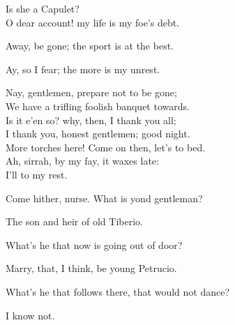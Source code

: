 \begin{speech}
Is she a Capulet? \\
O dear account! my life is my foe's debt. \\
\end{speech}
\begin{speech}
Away, be gone; the sport is at the best. \\
\end{speech}
\begin{speech}
Ay, so I fear; the more is my unrest. \\
\end{speech}
\begin{speech}
Nay, gentlemen, prepare not to be gone; \\
We have a trifling foolish banquet towards. \\
Is it e'en so? why, then, I thank you all; \\
I thank you, honest gentlemen; good night. \\
More torches here!   Come on then, let's to bed. \\
Ah, sirrah, by my fay, it waxes late: \\
I'll to my rest.  \\

\end{speech}
\begin{speech}
Come hither, nurse.   What is yond gentleman? \\
\end{speech}
\begin{speech}
The son and heir of old Tiberio. \\
\end{speech}
\begin{speech}
What's he that now is going out of door? \\
\end{speech}
\begin{speech}
Marry, that, I think, be young Petrucio. \\
\end{speech}
\begin{speech}
What's he that follows there, that would not dance?
\\
\end{speech}
\begin{speech}
I know not. \\
\end{speech}
